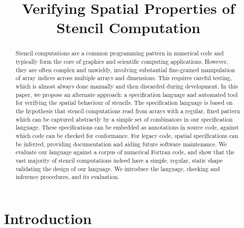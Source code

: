 \documentclass[10pt,preprint]{sigplanconf}
\title{Verifying Spatial Properties of Stencil Computation}
\theoremstyle{definition}
\begin{document}
\maketitle



\begin{abstract}
Stencil computations are a common programming pattern in numerical
  code and typically form the core of graphics and scientific
  computing applications. However, they are often complex and
  unwieldy, involving substantial fine-grained manipulation of array
  indices across multiple arrays and dimensions. This requires careful
  testing, which is almost always done manually and then discarded
  during development. In this paper, we propose an alternate approach:
  a specification language and automated tool for verifying the
  spatial behaviour of stencils. The specification language is based
  on the hypothesis that stencil computations read from arrays with a
  regular, fixed pattern which can be captured abstractly by a simple
  set of combinators in our specification language. These
  specifications can be embedded as annotations in source code,
  against which code can be checked for conformance. For legacy code,
  spatial specifications can be inferred, providing documentation and
  aiding future software maintenance. We evaluate our language against
  a corpus of numerical Fortran code, and show that the vast majority
  of stencil computations indeed have a simple, regular, static shape
  validating the design of our language.  We introduce the
  language, checking and inference procedures, and its evaluation.
\end{abstract}



\section{Introduction}\label{sec:intro}
\end{document}
